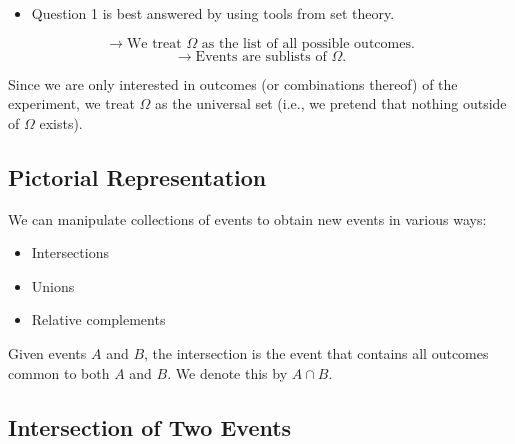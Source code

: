 \documentclass{article}
\begin{document}
\begin{itemize}
    \item Question 1 is best answered by using tools from set theory.
\end{itemize}

\[
\rightarrow \text{We treat } \Omega \text{ as the list of all possible outcomes.}
\]
\[
\rightarrow \text{Events are sublists of } \Omega.
\]

Since we are only interested in outcomes (or combinations thereof) of the experiment, we treat \(\Omega\) as the universal set (i.e., we pretend that nothing outside of \(\Omega\) exists).

\subsection*{Pictorial Representation}

\begin{center}
\end{center}

\pagebreak

We can manipulate collections of events to obtain new events in various ways:

\begin{itemize}
    \item Intersections
    \item Unions
    \item Relative complements
\end{itemize}

Given events \(A\) and \(B\), the intersection is the event that contains all outcomes common to both \(A\) and \(B\). We denote this by \(A \cap B\).

\subsection*{Intersection of Two Events}

\begin{center}
\end{center}
\end{document}
